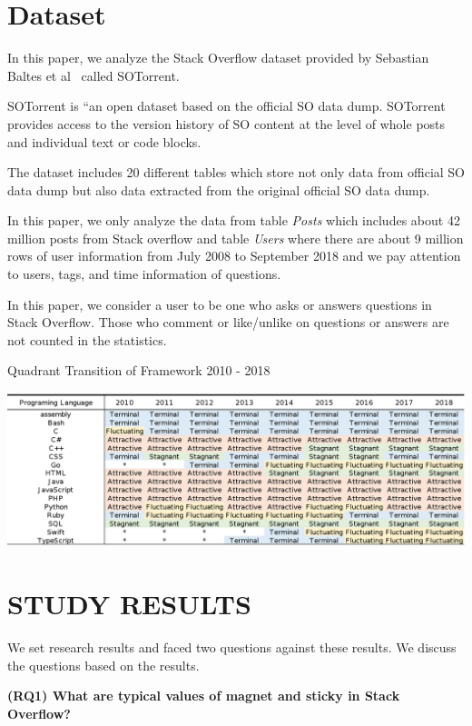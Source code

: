 \documentclass[english,preprint,JIP]{ipsj}
\begin{document}
\smallskip
\smallskip


\section{Dataset}
In this paper, we analyze the Stack Overflow dataset provided by Sebastian Baltes et al~\cite{msr2019challenge} called SOTorrent. 

SOTorrent is “an open dataset based on the official SO data dump. SOTorrent provides access to the version history of SO content at the level of whole posts and individual text or code blocks.

The dataset includes 20 different tables which store not only data from official SO data dump but also data extracted from the original official SO data dump.

In this paper, we only analyze the data from table \emph{Posts} which includes about 42 million posts from Stack overflow and table \emph{Users} where there are about 9 million rows of user information from July 2008 to September 2018 and we pay attention to users, tags, and time information of questions.

In this paper, we consider a user to be one who asks or answers questions in Stack Overflow. Those who comment or like/unlike on questions or answers are not counted in the statistics.


\begin{table}[t]
 \centering
 \caption{Quadrant Transition of Framework 2010 - 2018} 
 \includegraphics[width=1.0\hsize]{img/frame2010-2018.eps} 
 \label{table1} 
\end{table}

\section{STUDY RESULTS} %
We set research results and faced two questions against these results. We discuss the questions based on the results.
\smallskip
\smallskip

\textbf{(RQ1) What are typical values of magnet and sticky in Stack Overflow?}
\smallskip
\end{document}

